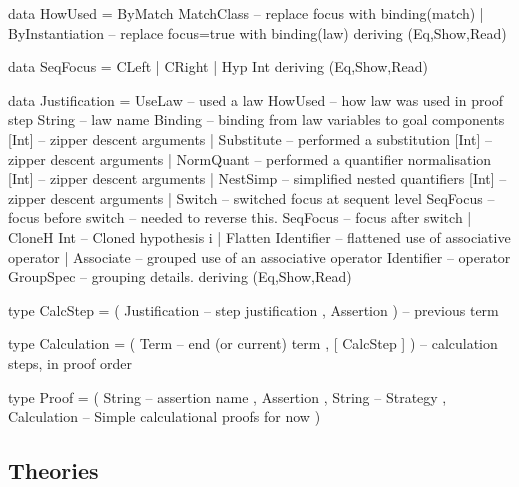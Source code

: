 \begin{code}
data HowUsed
  = ByMatch MatchClass  -- replace focus with binding(match)
  | ByInstantiation     -- replace focus=true with binding(law)
  deriving (Eq,Show,Read)
\end{code}

\begin{code}
data SeqFocus = CLeft | CRight | Hyp Int deriving (Eq,Show,Read)
\end{code}

\begin{code}
data Justification
  = UseLaw             -- used a law
      HowUsed              -- how law was used in proof step
      String               -- law name
      Binding              -- binding from law variables to goal components
      [Int]                -- zipper descent arguments
  | Substitute         -- performed a substitution
      [Int]                -- zipper descent arguments
  | NormQuant          -- performed a quantifier normalisation
      [Int]                -- zipper descent arguments
  | NestSimp           -- simplified nested quantifiers
      [Int]                -- zipper descent arguments
  | Switch             -- switched focus at sequent level
      SeqFocus             -- focus before switch -- needed to reverse this.
      SeqFocus             -- focus after switch
  | CloneH Int         --  Cloned hypothesis i
  | Flatten Identifier -- flattened use of associative operator
  | Associate          -- grouped use of an associative operator
      Identifier           -- operator
      GroupSpec            -- grouping details.
  deriving (Eq,Show,Read)
\end{code}

\begin{code}
type CalcStep
  = ( Justification  -- step justification
    , Assertion )         -- previous term
\end{code}

\begin{code}
type Calculation
  = ( Term -- end (or current) term
    , [ CalcStep ] )  -- calculation steps, in proof order
\end{code}

\begin{code}
type Proof
  = ( String -- assertion name
    , Assertion
    , String -- Strategy
    , Calculation -- Simple calculational proofs for now
    )
\end{code}


\subsection{Theories}


